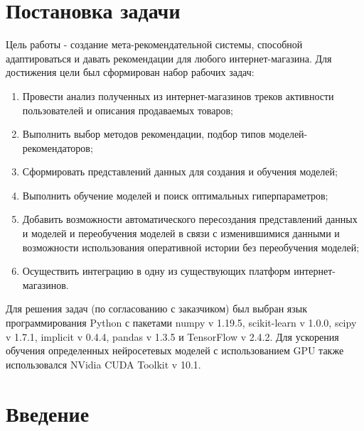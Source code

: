 \documentclass[14pt]{mmcs_article}
\begin{document}

\renewcommand{\contentsname}{Оглавление}

\tableofcontents

\newpage
{}

\section*{Постановка задачи}


Цель работы - создание мета-рекомендательной системы, способной адаптироваться и давать рекомендации для любого интернет-магазина. Для достижения цели был сформирован набор рабочих задач:
\begin{enumerate}
	\item Провести анализ полученных из интернет-магазинов треков активности пользователей и описания продаваемых товаров;
	\item Выполнить выбор методов рекомендации, подбор типов моделей-рекомендаторов;
	\item Сформировать представлений данных для создания и обучения моделей;
	\item Выполнить обучение моделей и поиск оптимальных гиперпараметров;
	\item Добавить возможности автоматического пересоздания представлений данных и моделей и переобучения моделей в связи с изменившимися данными и возможности использования оперативной истории без переобучения моделей;
	\item Осуществить интеграцию в одну из существующих платформ интернет-магазинов.
\end{enumerate}

Для решения задач (по согласованию с заказчиком) был выбран язык программирования Python с пакетами numpy v 1.19.5, scikit-learn v 1.0.0, scipy v 1.7.1, implicit v 0.4.4, pandas v 1.3.5 и TensorFlow v 2.4.2. Для ускорения обучения определенных нейросетевых моделей с использованием GPU также использовался NVidia CUDA Toolkit v 10.1.
 


\newpage
{}
\section*{Введение}
\end{document}
